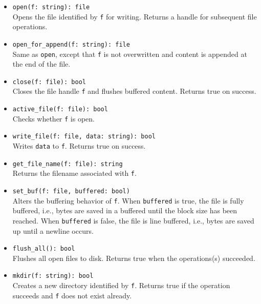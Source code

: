 \documentclass[10pt,landscape]{article}
\begin{document}
\begin{multicols*}{2}
\begin{itemize}
  \item \verb|open(f: string): file|\\
    Opens the file identified by \texttt{f} for writing. Returns a handle
    for subsequent file operations.
  \item \verb|open_for_append(f: string): file|\\
    Same as \texttt{open}, except that \texttt{f} is not overwritten and
    content is appended at the end of the file.
  \item \verb|close(f: file): bool|\\
    Closes the file handle \texttt{f} and flushes buffered content. Returns
    true on success.
  \item \verb|active_file(f: file): bool|\\
    Checks whether \texttt{f} is open.
  \item \verb|write_file(f: file, data: string): bool|\\
    Writes \texttt{data} to \texttt{f}. Returns true on success.
  \item \verb|get_file_name(f: file): string|\\
    Returns the filename associated with \texttt{f}.
  \item \verb|set_buf(f: file, buffered: bool)|\\
    Alters the buffering behavior of \texttt{f}. When \texttt{buffered} is
    true, the file is fully buffered, i.e., bytes are saved in a buffered until
    the block size has been reached. When \texttt{buffered} is false, the file
    is line buffered, i.e., bytes are saved up until a newline occurs.
  \item \verb|flush_all(): bool|\\
    Flushes all open files to disk.
    Returns true when the operations(s) succeeded.
  \item \verb|mkdir(f: string): bool|\\
    Creates a new directory identified by \texttt{f}. Returns true if the
    operation succeeds and \texttt{f} does not exist already.
\end{itemize}

\end{multicols*}
\end{document}
